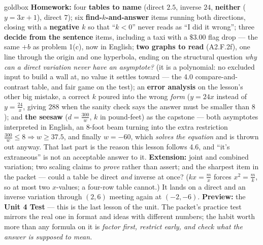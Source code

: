\documentclass[10pt]{article}
\begin{document}
\begin{skillbox}{goldbox}
\textbf{Homework:} four \textbf{tables to name} (direct $2.5$, inverse $24$, \textbf{neither}
($y=3x+1$), direct $7$); six \textbf{find-$k$-and-answer} items running both directions, closing with a
\textbf{negative $k$} so that ``$k<0$'' never reads as ``I did it wrong''; three \textbf{decide from the
sentence} items, including a taxi with a $\$3.00$ flag drop --- the same $+b$ as problem 1(c), now in
English; \textbf{two graphs to read} (A2.F.2f), one line through the origin and one hyperbola, ending on
the structural question \emph{why can a direct variation never have an asymptote?} (it is a polynomial:
no excluded input to build a wall at, no value it settles toward --- the 4.0 compare-and-contrast table,
and fair game on the test); an \textbf{error analysis} on the lesson's other big mistake, a correct $k$
poured into the wrong \emph{form} ($y=24x$ instead of $y=\frac{24}{x}$, giving $288$ when the sanity
check says the answer must be smaller than $8$); and \textbf{the seesaw} ($d=\frac{300}{w}$, $k$ in
pound-feet) as the capstone --- both asymptotes interpreted in English, an $8$-foot beam turning into
the extra restriction $\frac{300}{w}\le8 \Rightarrow w\ge37.5$, and finally $w=-60$, which \emph{solves
the equation} and is thrown out anyway. That last part is the reason this lesson follows 4.6, and
``it's extraneous'' is not an acceptable answer to it. \textbf{Extension:} joint and combined variation;
two scaling claims to \emph{prove} rather than assert; and the sharpest item in the packet --- could a
table be direct \emph{and} inverse at once? ($kx=\frac mx$ forces $x^2=\frac mk$, so at most two
$x$-values; a four-row table cannot.) It lands on a direct and an inverse variation through $(2,6)$
meeting again at $(-2,-6)$. \textbf{Preview:} the \textbf{Unit 4 Test} --- this is the last lesson of the
unit. The packet's practice test mirrors the real one in format and ideas with different numbers; the
habit worth more than any formula on it is \emph{factor first, restrict early, and check what the answer
is supposed to mean.}
\end{skillbox}
\end{document}
